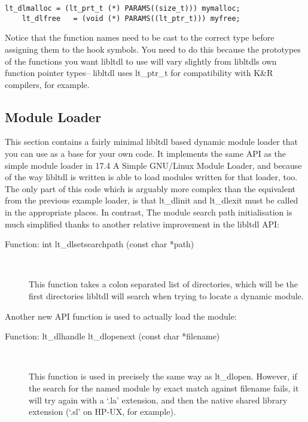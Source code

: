  	
\begin{Verbatim}[frame=single]
    lt_dlmalloc = (lt_prt_t (*) PARAMS((size_t))) mymalloc;
    lt_dlfree   = (void (*) PARAMS((lt_ptr_t))) myfree;
\end{Verbatim}

Notice that the function names need to be cast to the correct type before 
assigning them to the hook symbols. You need to do this because the 
prototypes of the functions you want libltdl to use will vary slightly from 
libltdls own function pointer types-- libltdl uses lt\_{}ptr\_{}t for 
compatibility with K\&R compilers, for example. 

\subsection{Module Loader}

This section contains a fairly minimal libltdl based dynamic module loader that you can use as a base for your own code. It implements the same API as the simple module loader in 17.4 A Simple GNU/Linux Module Loader, and because of the way libltdl is written is able to load modules written for that loader, too. The only part of this code which is arguably more complex than the equivalent from the previous example loader, is that lt\_{}dlinit and lt\_{}dlexit must be called in the appropriate places. In contrast, The module search path initialisation is much simplified thanks to another relative improvement in the libltdl API: 

\begin{description}
\item[Function: int lt\_{}dlsetsearchpath (const char *path)]
\

    This function takes a colon separated list of directories, which will be the first directories libltdl will search when trying to locate a dynamic module. 

\end{description}
Another new API function is used to actually load the module:

\begin{description}
\item[Function: lt\_{}dlhandle lt\_{}dlopenext (const char *filename)]
\

This function is used in precisely the same way as lt\_{}dlopen. However, if the search for the named module by exact match against filename fails, it will try again with a `.la' extension, and then the native shared library extension (`.sl' on HP-UX, for example). 
\end{description}

